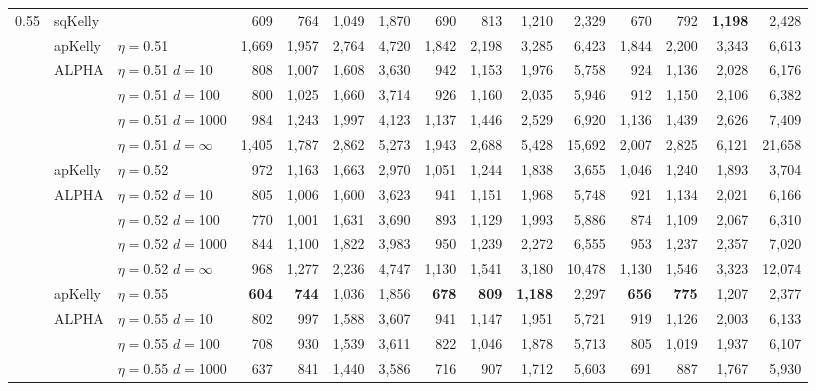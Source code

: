 \documentclass[12pt,runningheads]{llncs}
\begin{document}
{\begin{table}
\begin{tabular}{lll|rrrr|rrrr|rrrr}
\hline 0.55 & sqKelly & & 609  & 764  & 1,049  & 1,870  & 690  & 813  & 1,210  & 2,329  & 670  & 792  & \bf{1,198}  & 2,428  \\
\cline{2-15} & apKelly & $\eta=$0.51 & 1,669  & 1,957  & 2,764  & 4,720  & 1,842  & 2,198  & 3,285  & 6,423  & 1,844  & 2,200  & 3,343  & 6,613  \\
\cline{2-15}
& ALPHA & $\eta=$0.51 $d=$10 & 808  & 1,007  & 1,608  & 3,630  & 942  & 1,153  & 1,976  & 5,758  & 924  & 1,136  & 2,028  & 6,176  \\
&  & $\eta=$0.51 $d=$100 & 800  & 1,025  & 1,660  & 3,714  & 926  & 1,160  & 2,035  & 5,946  & 912  & 1,150  & 2,106  & 6,382  \\
&  & $\eta=$0.51 $d=$1000 & 984  & 1,243  & 1,997  & 4,123  & 1,137  & 1,446  & 2,529  & 6,920  & 1,136  & 1,439  & 2,626  & 7,409  \\
 &  & $\eta=$0.51 $d=\infty$ & 1,405  & 1,787  & 2,862  & 5,273  & 1,943  & 2,688  & 5,428  & 15,692  & 2,007  & 2,825  & 6,121  & 21,658  \\
\cline{2-15} & apKelly & $\eta=$0.52 & 972  & 1,163  & 1,663  & 2,970  & 1,051  & 1,244  & 1,838  & 3,655  & 1,046  & 1,240  & 1,893  & 3,704  \\
\cline{2-15}
& ALPHA & $\eta=$0.52 $d=$10 & 805  & 1,006  & 1,600  & 3,623  & 941  & 1,151  & 1,968  & 5,748  & 921  & 1,134  & 2,021  & 6,166  \\
&  & $\eta=$0.52 $d=$100 & 770  & 1,001  & 1,631  & 3,690  & 893  & 1,129  & 1,993  & 5,886  & 874  & 1,109  & 2,067  & 6,310  \\
&  & $\eta=$0.52 $d=$1000 & 844  & 1,100  & 1,822  & 3,983  & 950  & 1,239  & 2,272  & 6,555  & 953  & 1,237  & 2,357  & 7,020  \\
 &  & $\eta=$0.52 $d=\infty$ & 968  & 1,277  & 2,236  & 4,747  & 1,130  & 1,541  & 3,180  & 10,478  & 1,130  & 1,546  & 3,323  & 12,074  \\
\cline{2-15} & apKelly & $\eta=$0.55 & \bf{604}  & \bf{744}  & 1,036  & 1,856  & \bf{678}  & \bf{809}  & \bf{1,188}  & 2,297  & \bf{656}  & \bf{775}  & 1,207  & 2,377  \\
\cline{2-15}
& ALPHA & $\eta=$0.55 $d=$10 & 802  & 997  & 1,588  & 3,607  & 941  & 1,147  & 1,951  & 5,721  & 919  & 1,126  & 2,003  & 6,133  \\
&  & $\eta=$0.55 $d=$100 & 708  & 930  & 1,539  & 3,611  & 822  & 1,046  & 1,878  & 5,713  & 805  & 1,019  & 1,937  & 6,107  \\
&  & $\eta=$0.55 $d=$1000 & 637  & 841  & 1,440  & 3,586  & 716  & 907  & 1,712  & 5,603  & 691  & 887  & 1,767  & 5,930  \\

\end{tabular}
\end{table}}
\end{document}
